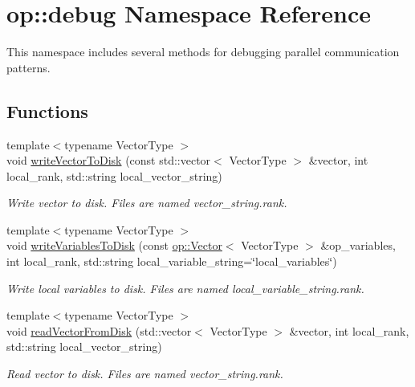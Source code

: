 \hypertarget{namespaceop_1_1debug}{\section{op\-:\-:debug Namespace Reference}
\label{namespaceop_1_1debug}
}


This namespace includes several methods for debugging parallel communication patterns.  


\subsection*{Functions}
\begin{DoxyCompactItemize}
\item 
{\footnotesize template$<$typename Vector\-Type $>$ }\\void \hyperlink{namespaceop_1_1debug_a0a8c9ff1a57c5f7ae8aee504ba1ebde6}{write\-Vector\-To\-Disk} (const std\-::vector$<$ Vector\-Type $>$ \&vector, int local\-\_\-rank, std\-::string local\-\_\-vector\-\_\-string)
\begin{DoxyCompactList}\small\item\em Write vector to disk. Files are named vector\-\_\-string.\-rank. \end{DoxyCompactList}\item 
{\footnotesize template$<$typename Vector\-Type $>$ }\\void \hyperlink{namespaceop_1_1debug_a9dcaf54913431ab95c49abcf25d845bd}{write\-Variables\-To\-Disk} (const \hyperlink{classop_1_1Vector}{op\-::\-Vector}$<$ Vector\-Type $>$ \&op\-\_\-variables, int local\-\_\-rank, std\-::string local\-\_\-variable\-\_\-string=\char`\"{}local\-\_\-variables\char`\"{})
\begin{DoxyCompactList}\small\item\em Write local variables to disk. Files are named local\-\_\-variable\-\_\-string.\-rank. \end{DoxyCompactList}\item 
{\footnotesize template$<$typename Vector\-Type $>$ }\\void \hyperlink{namespaceop_1_1debug_afd5326bb4e2925b8c4032d2c6d8a96ab}{read\-Vector\-From\-Disk} (std\-::vector$<$ Vector\-Type $>$ \&vector, int local\-\_\-rank, std\-::string local\-\_\-vector\-\_\-string)
\begin{DoxyCompactList}\small\item\em Read vector to disk. Files are named vector\-\_\-string.\-rank. \end{DoxyCompactList}\item 

\end{DoxyCompactItemize}
